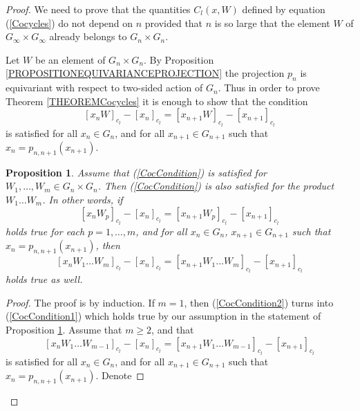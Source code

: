 \documentclass[12pt]{amsart}
\newtheorem{prop}[thm]{Proposition}
\theoremstyle{definition}
\numberwithin{equation}{section}
\begin{document}
\begin{proof}We need to prove that the quantities $C_l(x,W)$ defined by equation (\ref{Cocycles}) do not depend on $n$ provided that $n$ is so large that
the element $W$ of $G_{\infty}\times G_{\infty}$ already belongs to $G_n\times G_n$.



Let $W$ be an element of $G_n\times G_n$. By Proposition \ref{PROPOSITIONEQUIVARIANCEPROJECTION} the projection $p_n$ is equivariant with respect to two-sided action of $G_n$. Thus in order to
prove Theorem \ref{THEOREMCocycles} it is enough to show that the condition
\begin{equation}\label{CocCondition}
\left[x_nW\right]_{c_l}-\left[x_n\right]_{c_l}=\left[x_{n+1}W\right]_{c_l}-\left[x_{n+1}\right]_{c_l}
\end{equation}
is satisfied for all $x_n\in G_n$, and for all $x_{n+1}\in G_{n+1}$ such that $x_n=p_{n,n+1}\left(x_{n+1}\right)$.
\begin{prop}\label{PROPOSITIONCoW}Assume that (\ref{CocCondition}) is satisfied for $W_1,\ldots, W_m\in G_n\times G_n$. Then
(\ref{CocCondition}) is also satisfied for the product $W_1\ldots W_m$. In other words, if
\begin{equation}\label{CocCondition1}
\left[x_nW_p\right]_{c_l}-\left[x_n\right]_{c_l}=\left[x_{n+1}W_p\right]_{c_l}-\left[x_{n+1}\right]_{c_l}
\end{equation}
holds true for each $p=1,\ldots,m$,  and for all $x_n\in G_n$, $x_{n+1}\in G_{n+1}$ such that $x_n=p_{n,n+1}\left(x_{n+1}\right)$, then
\begin{equation}\label{CocCondition2}
\left[x_nW_1\ldots W_m\right]_{c_l}-\left[x_n\right]_{c_l}=\left[x_{n+1}W_1\ldots W_m\right]_{c_l}-\left[x_{n+1}\right]_{c_l}
\end{equation}
holds true as well.
\end{prop}
\begin{proof} The proof is by induction. If $m=1$, then (\ref{CocCondition2}) turns into
(\ref{CocCondition1}) which holds true by our assumption in the statement of Proposition \ref{PROPOSITIONCoW}.
Assume that $m\geq 2$, and that
\begin{equation}\label{CocCondition3}
\left[x_nW_1\ldots W_{m-1}\right]_{c_l}-\left[x_n\right]_{c_l}=\left[x_{n+1}W_1\ldots W_{m-1}\right]_{c_l}-\left[x_{n+1}\right]_{c_l}
\end{equation}
is satisfied for  all $x_n\in G_n$, and for all $x_{n+1}\in G_{n+1}$ such that $x_n=p_{n,n+1}\left(x_{n+1}\right)$.
Denote

\end{proof}
\end{proof}
\end{document}
